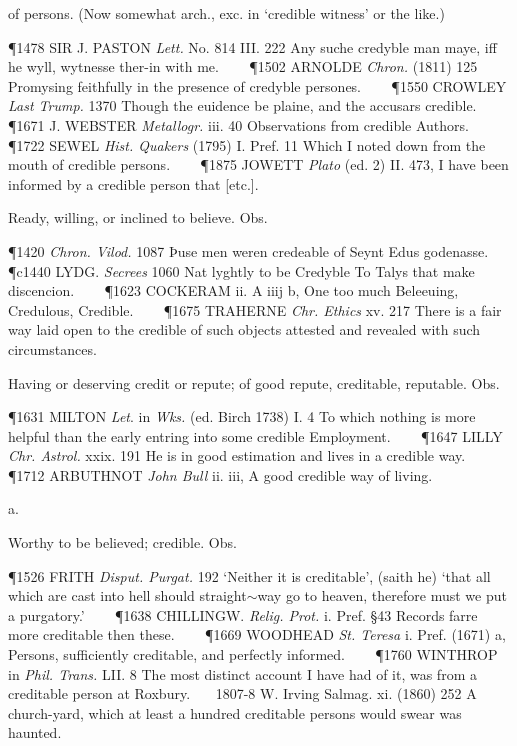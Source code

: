 \begin{description}[wide, labelwidth=!, labelindent=0pt]
\begin{myenumerate}
 of persons. (Now somewhat arch., exc. in ‘credible witness’ or the like.)

\P 1478 SIR J. PASTON  \textit{Lett.} No. 814 III. 222 Any suche credyble man maye, iff he wyll, wytnesse ther-in with me.    
\P 1502 ARNOLDE  \textit{Chron.} (1811) 125 Promysing feithfully in the presence of credyble persones.    
\P 1550 CROWLEY \textit{Last Trump.} 1370 Though  the euidence be plaine, and the accusars credible.    
\P 1671 J. WEBSTER  \textit{Metallogr.} iii. 40 Observations from credible Authors.    
\P 1722 SEWEL  \textit{Hist. Quakers} (1795) I. Pref. 11 Which I noted down from the mouth of credible persons.    
\P 1875 JOWETT  \textit{Plato} (ed. 2) II. 473, I have been informed by a credible person that [etc.].

 Ready, willing, or inclined to believe. Obs.

\P 1420  \textit{Chron. Vilod.} 1087 Þuse  men weren credeable of Seynt Edus godenasse.
\P c1440 LYDG. \textit{Secrees} 1060 Nat  lyghtly to be Credyble To Talys that make discencion.    
\P 1623 COCKERAM  ii. A iiij b, One too much Beleeuing, Credulous, Credible.    
\P 1675 TRAHERNE  \textit{Chr. Ethics} xv. 217 There is a fair way laid open to the credible of such objects attested and revealed with such circumstances.

 Having or deserving credit or repute; of good repute, creditable, reputable. Obs.

\P 1631 MILTON \textit{Let}. in  \textit{Wks.} (ed. Birch 1738) I. 4 To which nothing is more helpful than the early entring into some credible Employment.    
\P 1647 LILLY  \textit{Chr. Astrol.} xxix. 191 He is in good estimation and lives in a credible way.    
\P 1712 ARBUTHNOT  \textit{John Bull} ii. iii, A good credible way of living.
\end{myenumerate}


 a.

\noindent {}

\vspace{-0.3cm}

\begin{myenumerate}

  Worthy to be believed; credible. Obs.

\P 1526 FRITH  \textit{Disput. Purgat.} 192 ‘Neither it is creditable’, (saith he) ‘that all which are cast into hell should straight$\sim$way go to heaven, therefore must we put a purgatory.’    
\P 1638 CHILLINGW.  \textit{Relig. Prot.} i. Pref. §43 Records farre more creditable then these.    
\P 1669 WOODHEAD  \textit{St. Teresa} i. Pref. (1671) a, Persons, sufficiently creditable, and perfectly informed.    
\P 1760 WINTHROP in  \textit{Phil. Trans.} LII. 8 The most distinct account I have had of it, was from a creditable person at Roxbury.    1807-8 W. Irving Salmag. xi. (1860) 252 A church-yard, which at least a hundred creditable persons would swear was haunted.


\end{myenumerate}
\end{description}

